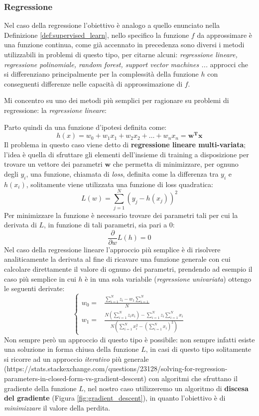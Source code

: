 \documentclass[../../main.tex]{subfiles}
\begin{document}
    \subsubsection{Regressione}

    Nel caso della regressione l'obiettivo è analogo a quello enunciato nella Definizione \ref{def:supervised_learn}, nello specifico la funzione $f$ da approssimare è una funzione continua, come già accennato in precedenza sono diversi i metodi utilizzabili in problemi di questo tipo, per citarne alcuni: \textit{regressione lineare, regressione polinomiale, random forest, support vector machines ...} approcci che si differenziano principalmente per la complessità della funzione $h$ con conseguenti differenze nelle capacità di approssimazione di $f$.

    Mi concentro su uno dei metodi più semplici per ragionare su problemi di regressione: la \textit{regressione lineare}:
    
    Parto quindi da una funzione d'ipotesi definita come:
    \[h(x) = w_0 + w_1x_1 + w_2x_2 + \dots + w_nx_n = \boldsymbol{w^T x}\]
    Il problema in questo caso viene detto di \textbf{regressione lineare multi-variata}; l'idea è quella di sfruttare gli elementi dell'insieme di training a disposizione per trovare un vettore dei parametri $\boldsymbol{w}$ che permetta di minimizzare, per ognuno degli $y_i$, una funzione, chiamata di \textit{loss}, definita come la differenza tra $y_i$ e $h(x_i)$, solitamente viene utilizzata una funzione di loss quadratica:
    \[L(w) = \sum_{j=1}^N(y_j - h(x_j))^2\]
    Per minimizzare la funzione è necessario trovare dei parametri tali per cui la derivata di $L$, in funzione di tali parametri, sia pari a 0:
    \[\frac{\partial}{\partial w} L(h) = 0\]
    Nel caso della regressione lineare l'approccio più semplice è di risolvere analiticamente la derivata al fine di ricavare una funzione generale con cui calcolare direttamente il valore di ognuno dei parametri, prendendo ad esempio il caso più semplice in cui $h$ è in una sola variabile (\textit{regressione univariata}) ottengo le seguenti derivate:
    \[
    \begin{cases}
        w_0 = & \frac{\sum_{i=1}^N z_i - w_1 \sum_{i=1}^N}{N}\\
        w_1 = & \frac{N(\sum_{i=1}^N z_ix_i) - \sum_{i=1}^N z_i \sum_{i=1}^N x_i}{N(\sum_{i=1}^N x_i^2 - (\sum_{i=1}^N x_i)^2)} 
    \end{cases}    
    \]
    Non sempre però un approccio di questo tipo è possibile: non sempre infatti esiste una soluzione in forma chiusa della funzione $L$, in casi di questo tipo solitamente si ricorre ad un approccio \textit{iterativo} più generale (https://stats.stackexchange.com/questions/23128/solving-for-regression-parameters-in-closed-form-vs-gradient-descent) con algoritmi che sfruttano il gradiente della funzione $L$, nel nostro caso utilizzeremo un algoritmo di \textbf{discesa del gradiente} (Figura \ref{fig:gradient_descent}), in quanto l'obiettivo è di \textit{minimizzare} il valore della perdita.
\end{document}
